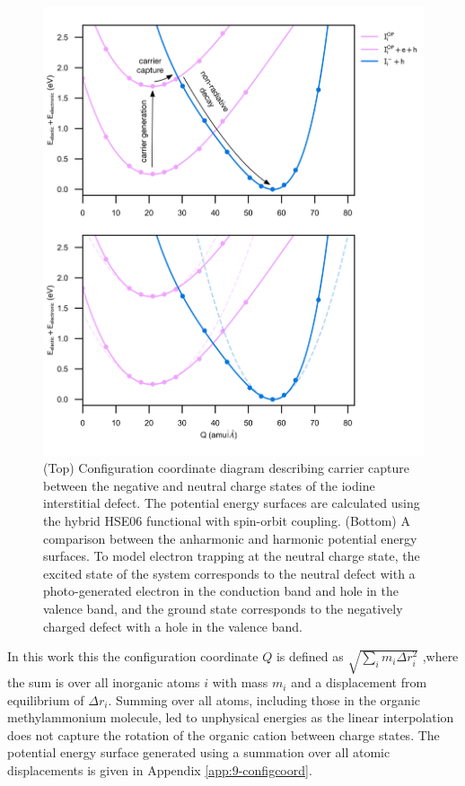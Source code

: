 \begin{figure}[h!]   
\centering
  \includegraphics[width=1.0\columnwidth]{figures/ch6/carrier_capture_digram.png}
  \caption[Configuration coordinate diagram for carrier capture between $\mathrm{I}_\mathrm{i}^-$ and $\mathrm{I}_\mathrm{i}$]{(Top) Configuration coordinate diagram describing carrier capture between the negative and neutral charge states of the iodine interstitial defect. The potential energy surfaces are calculated using the hybrid HSE06 functional with spin-orbit coupling. (Bottom) A comparison between the anharmonic and harmonic potential energy surfaces. To model electron trapping at the neutral charge state, the excited state of the system corresponds to the neutral defect with a photo-generated electron in the conduction band and hole in the valence band, and the ground state corresponds to the negatively charged defect with a hole in the valence band.}
\label{configuration_coordinate}
\end{figure}


In this work this the configuration coordinate $Q$ is defined as $\sqrt{\sum_i m_i \Delta r_i^2}$ ,where the sum is over all inorganic atoms $i$ with mass $m_i$ and a displacement from equilibrium of $\Delta r_i$. Summing over all atoms, including those in the organic methylammonium molecule, led to unphysical energies as the linear interpolation does not capture the rotation of the organic cation between charge states. The potential energy surface generated using a summation over all atomic displacements is given in Appendix \ref{app:9-configcoord}.

